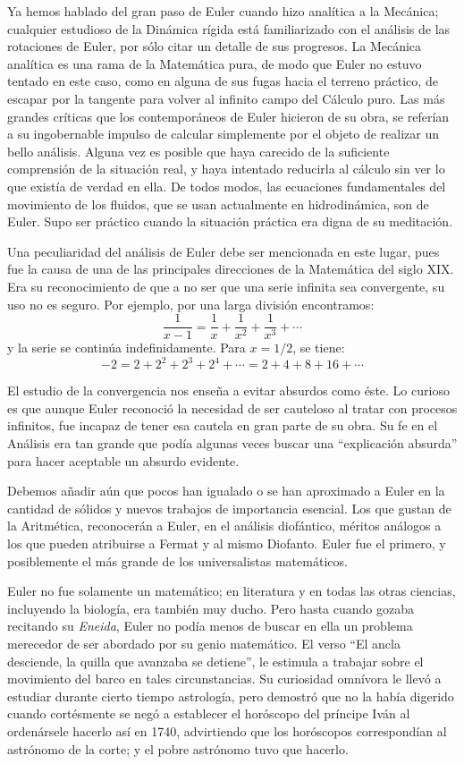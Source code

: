 \documentclass[a4paper, 12pt]{article}
\begin{document}
Ya hemos hablado del gran paso de Euler cuando hizo analítica a la Mecánica; cualquier estudioso de la Dinámica rígida está familiarizado con el análisis de las rotaciones de Euler, por sólo citar un detalle de sus progresos. La Mecánica analítica es una rama de la Matemática pura, de modo que Euler no estuvo tentado en este caso, como en alguna de sus fugas hacia el terreno práctico, de escapar por la tangente para volver al infinito campo del Cálculo puro. Las más grandes críticas que los contemporáneos de Euler hicieron de su obra, se referían a su ingobernable impulso de calcular simplemente por el objeto de realizar un bello análisis. Alguna vez es posible que haya carecido de la suficiente comprensión de la situación real, y haya intentado reducirla al cálculo sin ver lo que existía de verdad en ella. De todos modos, las ecuaciones fundamentales del movimiento de los fluidos, que se usan actualmente en hidrodinámica, son de Euler. Supo ser práctico cuando la situación práctica era digna de su meditación.

Una peculiaridad del análisis de Euler debe ser mencionada en este lugar, pues fue la causa de una de las principales direcciones de la Matemática del siglo XIX. Era su reconocimiento de que a no ser que una serie infinita sea convergente, su uso no es seguro. Por ejemplo, por una larga división encontramos:
$$
\frac{1}{x-1}= \frac{1}{x}+\frac{1}{x^2}+\frac{1}{x^3}+ \cdots
$$
y la serie se continúa indefinidamente. Para $x = 1/2$, se tiene:
$$
-2 = 2 + 2^2 + 2^3 + 2^4 + \cdots = 2 + 4 + 8 + 16 + \cdots
$$

El estudio de la convergencia  nos enseña a evitar absurdos como éste. Lo curioso es que aunque Euler reconoció la necesidad de ser cauteloso al tratar con procesos infinitos, fue incapaz de tener esa cautela en gran parte de su obra. Su fe en el Análisis era tan grande que podía algunas veces buscar una ``explicación absurda'' para hacer aceptable un absurdo evidente.

Debemos añadir aún que pocos han igualado o se han aproximado a Euler en la cantidad de sólidos y nuevos trabajos de importancia esencial. Los que gustan de la Aritmética, reconocerán a Euler, en el análisis diofántico, méritos análogos a los que pueden atribuirse a Fermat y al mismo Diofanto. Euler fue el primero, y posiblemente el más grande de los universalistas matemáticos.

Euler no fue solamente un matemático; en literatura y en todas las otras ciencias, incluyendo la biología, era también muy ducho. Pero hasta cuando gozaba recitando su {\it Eneida}, Euler no podía menos de buscar en ella un problema merecedor de ser abordado por su genio matemático. El verso ``El ancla desciende, la quilla que avanzaba se detiene'', le estimula a trabajar sobre el movimiento del barco en tales circunstancias. Su curiosidad omnívora le llevó a estudiar durante cierto tiempo astrología, pero demostró que no la había digerido cuando cortésmente se negó a establecer el horóscopo del príncipe Iván al ordenársele hacerlo así en 1740, advirtiendo que los horóscopos correspondían al astrónomo de la corte; y el pobre astrónomo tuvo que hacerlo.
\end{document}
